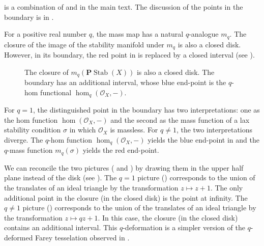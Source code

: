 \documentclass{amsart}
\begin{document}
   is a combination of  and  in the main text.
The discussion of the points in the boundary is in .

  For a positive real number \(q\), the mass map has a natural \(q\)-analogue \(m_q\).
  The closure of the image of the stability manifold under \(m_q\) is also a closed disk.
  However, in its boundary, the red point in  is replaced by a closed interval (see ).
  \begin{figure}[ht]
  \centering
      \caption{The closure of \(m_q(\mathbf{P} \operatorname{Stab}(X))\) is also a closed disk.
      The boundary has an additional interval, whose blue end-point is the \(q\)-hom functional \(\hom_q(\mathcal{O}_X,-)\).}
    \label{fig:q-disk}
  \end{figure}

  For \(q = 1\), the distinguished point in the boundary has two interpretations: one as the hom function \(\hom(\mathcal{O}_X, -)\) and the second as the mass function of a lax stability condition \(\sigma\) in which \(\mathcal{O}_X\) is massless.
  For \(q \neq 1\), the two interpretations diverge.
  The \(q\)-hom function \(\hom_q(\mathcal{O}_X,-)\) yields the blue end-point in  and the \(q\)-mass function \(m_q(\sigma)\) yields the red end-point.
  
  We can reconcile the two pictures ( and ) by drawing them in the upper half plane instead of the disk (see ).
  The \(q = 1\) picture () corresponds to the union of the translates of an ideal triangle by the transformation \(z \mapsto z + 1\).
  The only additional point in the closure (in the closed disk) is the point at infinity.
  The \(q \neq 1\) picture () corresponds to the union of the translates of an ideal triangle by the transformation \(z \mapsto q z + 1\).
  In this case, the closure (in the closed disk) contains an additional interval.
  This \(q\)-deformation is a simpler version of the \(q\)-deformed Farey tesselation observed in \cite{bap.bec.lic:22}.
  
\end{document}

